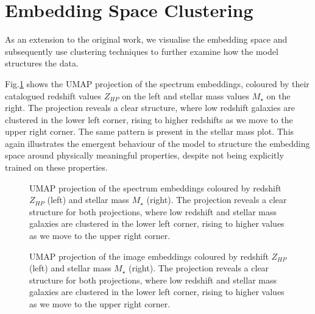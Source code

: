 \documentclass[a4paper,12pt]{article}
\begin{document}
\section{Embedding Space Clustering}
As an extension to the original work, we visualise the embedding space and subsequently use clustering techniques to further examine how the model structures the data. 

Fig.\ref{fig:umap_of_spectra} shows the UMAP projection of the spectrum embeddings, coloured by their catalogued redshift values $Z_{HP}$ on the left and stellar mass values $M_{\star}$ on the right. The projection reveals a clear structure, where low redshift galaxies are clustered in the lower left corner, rising to higher redshifts as we move to the upper right corner. The same pattern is present in the stellar mass plot. This again illustrates the emergent behaviour of the model to structure the embedding space around physically meaningful properties, despite not being explicitly trained on these properties. 


\begin{figure}[H]
    \centering
    \caption{UMAP projection of the spectrum embeddings coloured by redshift $Z_{HP}$ (left) and stellar mass $M_{\star}$ (right). The projection reveals a clear structure for both projections, where low redshift and stellar mass galaxies are clustered in the lower left corner, rising to higher values as we move to the upper right corner.}
    \label{fig:umap_of_spectra}
\end{figure}

\begin{figure}[H]
    \centering
    \caption{UMAP projection of the image embeddings coloured by redshift $Z_{HP}$ (left) and stellar mass $M_{\star}$ (right). The projection reveals a clear structure for both projections, where low redshift and stellar mass galaxies are clustered in the lower left corner, rising to higher values as we move to the upper right corner.}
    \label{fig:umap_of_images}
\end{figure}
\end{document}
